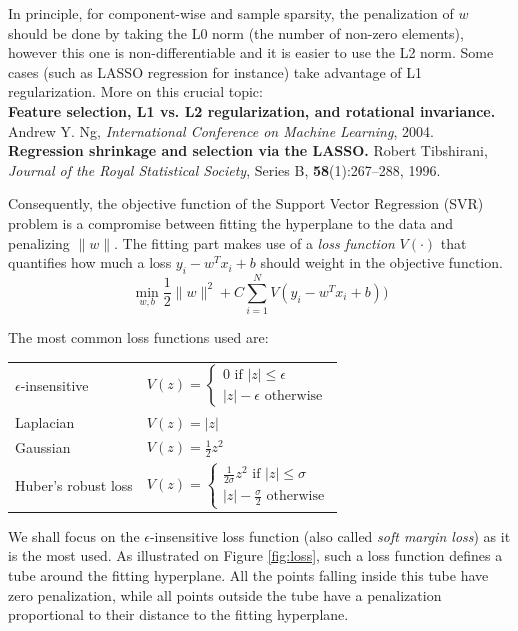 \documentclass{article}
\begin{document}
In principle, for component-wise and sample sparsity, the penalization of $w$ should be done by taking the L0 norm (the number of non-zero elements), however this one is non-differentiable and it is easier to use the L2 norm. Some cases (such as LASSO regression for instance) take advantage of L1 regularization. More on this crucial topic:\\
\textbf{Feature selection, L1 vs. L2 regularization, and rotational invariance.} Andrew Y. Ng, \textit{International Conference on Machine Learning}, 2004.\\
\textbf{Regression shrinkage and selection via the LASSO.} Robert Tibshirani, \textit{Journal of the Royal Statistical Society}, Series B, \textbf{58}(1):267--288, 1996.

Consequently, the objective function of the Support Vector Regression (SVR) problem is a compromise between fitting the hyperplane to the data and penalizing $\|w\|$. The fitting part makes use of a \emph{loss function} $V(\cdot)$ that quantifies how much a loss $y_i-w^T x_i + b$ should weight in the objective function.
\begin{equation*}
\min\limits_{w,b} \frac{1}{2} \|w\|^2 + C \sum\limits_{i=1}^N V(y_i-w^T x_i + b))
\end{equation*}

The most common loss functions used are:\\
\begin{tabular}{ll}
$\epsilon$-insensitive & $V(z) = \left\{\begin{array}{l} 0\text{ if }|z|\leq\epsilon\\ |z|-\epsilon\text{ otherwise}\end{array}\right.$\\
Laplacian & $V(z) = |z|$\\
Gaussian & $V(z) = \frac{1}{2}z^2$\\
Huber's robust loss & $V(z) = \left\{\begin{array}{l}\frac{1}{2\sigma}z^2\text{ if }|z|\leq\sigma \\ |z|-\frac{\sigma}{2}\text{ otherwise}\end{array}\right.$\\
\end{tabular}

We shall focus on the $\epsilon$-insensitive loss function (also called \emph{soft margin loss}) as it is the most used. As illustrated on Figure \ref{fig:loss}, such a loss function defines a tube around the fitting hyperplane. All the points falling inside this tube have zero penalization, while all points outside the tube have a penalization proportional to their distance to the fitting hyperplane.
\end{document}
